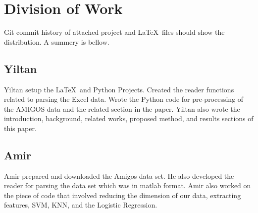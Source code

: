 \section{Division of Work}
\label{sec:division_of_work}
Git commit history of attached project and
\LaTeX~files should show the distribution.
A summery is bellow.

\subsection{Yiltan}
Yiltan setup the \LaTeX~and Python Projects.
Created the reader functions related to parsing the Excel data.
Wrote the Python code for pre-processing of the AMIGOS data
and the related section in the paper.
Yiltan also wrote the introduction, background, related works,
proposed method, and results sections of this paper.

\subsection{Amir}
Amir prepared and downloaded the Amigos data set.
He also developed the reader for parsing the data set
which was in matlab format.
Amir also worked on the piece of code that involved reducing the dimension of our data, extracting features, SVM, KNN, and the Logistic Regression.
